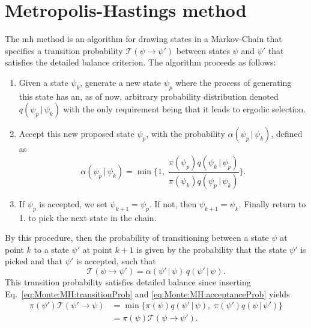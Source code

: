 \section{Metropolis-Hastings method}

The \ac{mh} method is an algorithm for drawing states in a Markov-Chain that specifies a transition probability
$\mathcal{T}(\psi\to\psi')$ between states $\psi$ and $\psi'$ that satisfies the detailed balance criterion. The algorithm proceeds
as follows:
\begin{enumerate}
    \item Given a state $\psi_k$, generate a new state $\psi_p$ where the process of generating this state has an, as of now, arbitrary
        probability distribution denoted $q(\psi_p\,|\,\psi_k)$ with the only requirement being that it leads to ergodic selection.
    \item Accept this new proposed state $\psi_p$, with the probability $\alpha(\psi_p\,|\,\psi_k)$,
        defined as
        \begin{equation}
            \label{eq:Monte:MH:acceptanceProb}
            \alpha(\psi_p\,|\,\psi_k) = \min\bigg\{1,\;\frac{\pi(\psi_p)q(\psi_k\,|\,\psi_p)}{\pi(\psi_k)q(\psi_p\,|\,\psi_k)}\bigg\}.
        \end{equation}
    \item If $\psi_p$ is accepted, we set $\psi_{k+1}=\psi_p$. If not, then $\psi_{k+1}=\psi_k$. Finally return to 1. to pick the next
        state in the chain.
\end{enumerate}
By this procedure, then the probability of transitioning between a state $\psi$ at point $k$ to a state $\psi'$ at point $k+1$ is
given by the probability that the state $\psi'$ is picked and that $\psi'$ is accepted, such that
\begin{equation}
    \label{eq:Monte:MH:transitionProb}
    \mathcal{T}(\psi\to\psi') = \alpha(\psi'\,|\,\psi)\,q(\psi'\,|\,\psi).
\end{equation}
This transition probability satisfies detailed balance since inserting Eq.~\eqref{eq:Monte:MH:transitionProb} and
\eqref{eq:Monte:MH:acceptanceProb} yields
\begin{equation}
    \label{eq:Monte:MH:detailedBalance}
    \begin{split}
        \pi(\psi')\mathcal{T}(\psi'\to\psi) &= \min\{\pi(\psi)q(\psi'\,|\,\psi),\;\pi(\psi')q(\psi\,|\,\psi')\}\\
        &= \pi(\psi)\mathcal{T}(\psi\to\psi').
    \end{split}
\end{equation}

